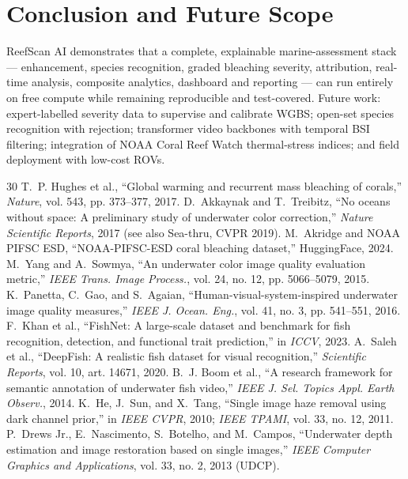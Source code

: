 \documentclass[conference]{IEEEtran}
\begin{document}
\section{Conclusion and Future Scope}
ReefScan AI demonstrates that a complete, explainable marine-assessment stack --- enhancement, species recognition, graded bleaching severity, attribution, real-time analysis, composite analytics, dashboard and reporting --- can run entirely on free compute while remaining reproducible and test-covered. Future work: expert-labelled severity data to supervise and calibrate WGBS; open-set species recognition with rejection; transformer video backbones with temporal BSI filtering; integration of NOAA Coral Reef Watch thermal-stress indices; and field deployment with low-cost ROVs.

\begin{thebibliography}{30}
 T.~P. Hughes et al., ``Global warming and recurrent mass bleaching of corals,'' \emph{Nature}, vol. 543, pp. 373--377, 2017.
 D.~Akkaynak and T.~Treibitz, ``No oceans without space: A preliminary study of underwater color correction,'' \emph{Nature Scientific Reports}, 2017 (see also Sea-thru, CVPR 2019).
 M.~Akridge and NOAA PIFSC ESD, ``NOAA-PIFSC-ESD coral bleaching dataset,'' HuggingFace, 2024.
 M.~Yang and A.~Sowmya, ``An underwater color image quality evaluation metric,'' \emph{IEEE Trans. Image Process.}, vol. 24, no. 12, pp. 5066--5079, 2015.
 K.~Panetta, C.~Gao, and S.~Agaian, ``Human-visual-system-inspired underwater image quality measures,'' \emph{IEEE J. Ocean. Eng.}, vol. 41, no. 3, pp. 541--551, 2016.
 F.~Khan et al., ``FishNet: A large-scale dataset and benchmark for fish recognition, detection, and functional trait prediction,'' in \emph{ICCV}, 2023.
 A.~Saleh et al., ``DeepFish: A realistic fish dataset for visual recognition,'' \emph{Scientific Reports}, vol. 10, art. 14671, 2020.
 B.~J. Boom et al., ``A research framework for semantic annotation of underwater fish video,'' \emph{IEEE J. Sel. Topics Appl. Earth Observ.}, 2014.
 K.~He, J.~Sun, and X.~Tang, ``Single image haze removal using dark channel prior,'' in \emph{IEEE CVPR}, 2010; \emph{IEEE TPAMI}, vol. 33, no. 12, 2011.
 P.~Drews Jr., E.~Nascimento, S.~Botelho, and M.~Campos, ``Underwater depth estimation and image restoration based on single images,'' \emph{IEEE Computer Graphics and Applications}, vol. 33, no. 2, 2013 (UDCP).

\end{thebibliography}
\end{document}
